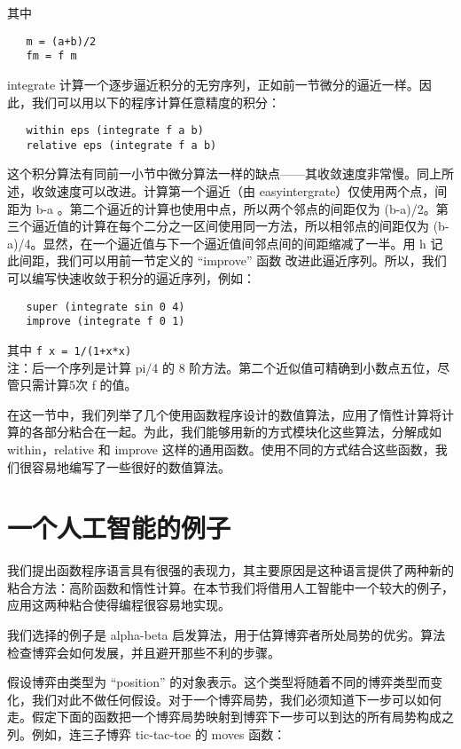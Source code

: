 \documentclass[12pt,a4paper]{article}
\begin{document}
其中

\begin{verbatim}
   m = (a+b)/2
   fm = f m
\end{verbatim}

integrate 计算一个逐步逼近积分的无穷序列，正如前一节微分的逼近一样。因此，我们可以用以下的程序计算任意精度的积分：

\begin{verbatim}
   within eps (integrate f a b)
   relative eps (integrate f a b)
\end{verbatim}

这个积分算法有同前一小节中微分算法一样的缺点——其收敛速度非常慢。同上所述，收敛速度可以改进。计算第一个逼近（由 easyintergrate）仅使用两个点，间距为 b-a 。第二个逼近的计算也使用中点，所以两个邻点的间距仅为 (b-a)/2。第三个逼近值的计算在每个二分之一区间使用同一方法，所以相邻点的间距仅为 (b-a)/4。显然，在一个逼近值与下一个逼近值间邻点间的间距缩减了一半。用 h 记此间距，我们可以用前一节定义的 ``improve'' 函数 改进此逼近序列。所以，我们可以编写快速收敛于积分的逼近序列，例如：

\begin{verbatim}
   super (integrate sin 0 4)
   improve (integrate f 0 1)
\end{verbatim}

其中 \verb"f x = 1/(1+x*x)"\\

注：后一个序列是计算 pi/4 的 8 阶方法。第二个近似值可精确到小数点五位，尽管只需计算5次 f 的值。

在这一节中，我们列举了几个使用函数程序设计的数值算法，应用了惰性计算将计算的各部分粘合在一起。为此，我们能够用新的方式模块化这些算法，分解成如 within，relative 和 improve 这样的通用函数。使用不同的方式结合这些函数，我们很容易地编写了一些很好的数值算法。

\section{一个人工智能的例子}

我们提出函数程序语言具有很强的表现力，其主要原因是这种语言提供了两种新的粘合方法：高阶函数和惰性计算。在本节我们将借用人工智能中一个较大的例子，应用这两种粘合使得编程很容易地实现。

我们选择的例子是 alpha-beta 启发算法，用于估算博弈者所处局势的优劣。算法检查博弈会如何发展，并且避开那些不利的步骤。

假设博弈由类型为 ``position'' 的对象表示。这个类型将随着不同的博弈类型而变化，我们对此不做任何假设。对于一个博弈局势，我们必须知道下一步可以如何走。假定下面的函数把一个博弈局势映射到博弈下一步可以到达的所有局势构成之列。例如，连三子博弈 tic-tac-toe 的 moves 函数：
\end{document}
